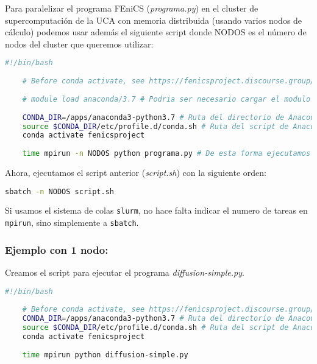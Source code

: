 Para paralelizar el programa FEniCS (\textit{programa.py}) en el cluster de supercomputación de la UCA con memoria distribuida (usando varios nodos de cálculo) podemos usar además el siguiente script donde NODOS es el número de nodos del cluster que queremos utilizar:
\begin{lstlisting}[language=sh]
	#!/bin/bash
	
	# Before conda activate, see https://fenicsproject.discourse.group/t/fenics-from-conda-doesnt-import/3502/6
	
	# module load anaconda/3.7 # Podria ser necesario cargar el modulo si necesitamos actualizar las variables de tipo $PATH de nuestra shell con las que incorpora el modulo, por ejemplo, si hacemos una instalacion local de anaconda y queremos usar la instalacion sudo
	
	CONDA_DIR=/apps/anaconda3-python3.7 # Ruta del directorio de Anaconda
	source $CONDA_DIR/etc/profile.d/conda.sh # Ruta del script de Anaconda
	conda activate fenicsproject
	
	time mpirun -n NODOS python programa.py # De esta forma ejecutamos tantos procesos como indiquemos con NODOS, hay que cambiar el numero de procesos y ajustarlo al numero de nodos del cluster que queramos usar.
\end{lstlisting}

Ahora, ejecutamos el script anterior (\textit{script.sh}) con la siguiente orden:
\begin{lstlisting}[language=sh]
sbatch -n NODOS script.sh
\end{lstlisting}
Si usamos el sistema de colas \texttt{slurm}, no hace falta indicar el numero de tareas en \texttt{mpirun}, sino simplemente a \texttt{sbatch}.

\subsubsection*{Ejemplo con 1 nodo:}

Creamos el script para ejecutar el programa \textit{diffusion-simple.py}.
\begin{lstlisting}[language=sh]
	#!/bin/bash
	
	# Before conda activate, see https://fenicsproject.discourse.group/t/fenics-from-conda-doesnt-import/3502/6
	CONDA_DIR=/apps/anaconda3-python3.7 # Ruta del directorio de Anaconda
	source $CONDA_DIR/etc/profile.d/conda.sh # Ruta del script de Anaconda
	conda activate fenicsproject
	
	time mpirun python diffusion-simple.py
\end{lstlisting}

